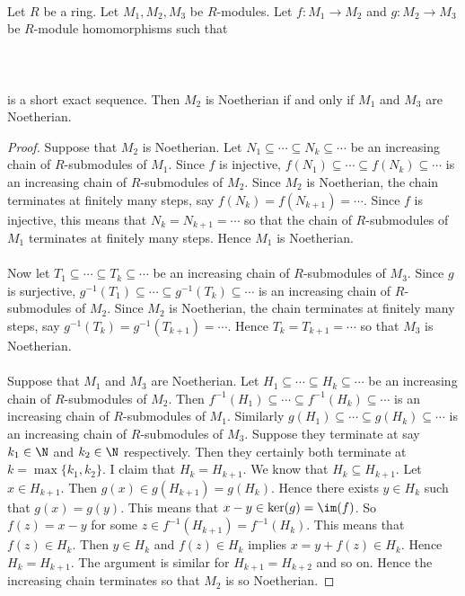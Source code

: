 \documentclass[a4paper]{article}
\begin{document}
\begin{prp}{}{}\\
Let $R$ be a ring. Let $M_1,M_2,M_3$ be $R$-modules. Let $f:M_1\to M_2$ and $g:M_2\to M_3$ be $R$-module homomorphisms such that \\~\\
\\~\\
is a short exact sequence. Then $M_2$ is Noetherian if and only if $M_1$ and $M_3$ are Noetherian. 
\begin{proof}
Suppose that $M_2$ is Noetherian. Let $N_1\subseteq\cdots\subseteq N_k\subseteq\cdots$ be an increasing chain of $R$-submodules of $M_1$. Since $f$ is injective, $f(N_1)\subseteq\cdots\subseteq f(N_k)\subseteq\cdots$ is an increasing chain of $R$-submodules of $M_2$. Since $M_2$ is Noetherian, the chain terminates at finitely many steps, say $f(N_k)=f(N_{k+1})=\cdots$. Since $f$ is injective, this means that $N_k=N_{k+1}=\cdots$ so that the chain of $R$-submodules of $M_1$ terminates at finitely many steps. Hence $M_1$ is Noetherian. \\~\\

Now let $T_1\subseteq\cdots\subseteq T_k\subseteq\cdots$ be an increasing chain of $R$-submodules of $M_3$. Since $g$ is surjective, $g^{-1}(T_1)\subseteq\cdots\subseteq g^{-1}(T_k)\subseteq\cdots$ is an increasing chain of $R$-submodules of $M_2$. Since $M_2$ is Noetherian, the chain terminates at finitely many steps, say $g^{-1}(T_k)=g^{-1}(T_{k+1})=\cdots$. Hence $T_k=T_{k+1}=\cdots$ so that $M_3$ is Noetherian. \\~\\

Suppose that $M_1$ and $M_3$ are Noetherian. Let $H_1\subseteq\cdots\subseteq H_k\subseteq\cdots$ be an increasing chain of $R$-submodules of $M_2$. Then $f^{-1}(H_1)\subseteq\cdots\subseteq f^{-1}(H_k)\subseteq\cdots$ is an increasing chain of $R$-submodules of $M_1$. Similarly $g(H_1)\subseteq\cdots\subseteq g(H_k)\subseteq\cdots$ is an increasing chain of $R$-submodules of $M_3$. Suppose they terminate at say $k_1\in\N$ and $k_2\in\N$ respectively. Then they certainly both terminate at $k=\max\{k_1,k_2\}$. I claim that $H_k=H_{k+1}$. We know that $H_k\subseteq H_{k+1}$. Let $x\in H_{k+1}$. Then $g(x)\in g(H_{k+1})=g(H_k)$. Hence there exists $y\in H_k$ such that $g(x)=g(y)$. This means that $x-y\in\ker(g)=\im(f)$. So $f(z)=x-y$ for some $z\in f^{-1}(H_{k+1})=f^{-1}(H_k)$. This means that $f(z)\in H_k$. Then $y\in H_k$ and $f(z)\in H_k$ implies $x=y+f(z)\in H_k$. Hence $H_k=H_{k+1}$. The argument is similar for $H_{k+1}=H_{k+2}$ and so on. Hence the increasing chain terminates so that $M_2$ is so Noetherian. 
\end{proof}
\end{prp}
\end{document}
